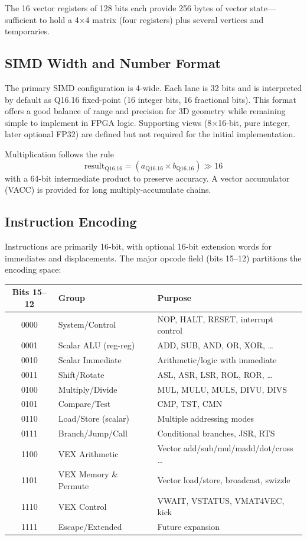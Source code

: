 \documentclass[11pt,a4paper]{article}
\begin{document}
The 16 vector registers of 128 bits each provide 256 bytes of vector state---sufficient to hold a 4$\times$4 matrix (four registers) plus several vertices and temporaries.

\subsection{SIMD Width and Number Format}

The primary SIMD configuration is 4-wide. Each lane is 32 bits and is interpreted by default as Q16.16 fixed-point (16 integer bits, 16 fractional bits). This format offers a good balance of range and precision for 3D geometry while remaining simple to implement in FPGA logic. Supporting views (8$\times$16-bit, pure integer, later optional FP32) are defined but not required for the initial implementation.

Multiplication follows the rule
\[
\text{result}_{\text{Q16.16}} = (a_{\text{Q16.16}} \times b_{\text{Q16.16}}) \gg 16
\]
with a 64-bit intermediate product to preserve accuracy. A vector accumulator (VACC) is provided for long multiply-accumulate chains.

\subsection{Instruction Encoding}

Instructions are primarily 16-bit, with optional 16-bit extension words for immediates and displacements. The major opcode field (bits 15--12) partitions the encoding space:

\begin{center}
\begin{tabular}{@{}clp{7cm}@{}}
\toprule
Bits 15--12 & Group & Purpose \\
\midrule
0000 & System/Control & NOP, HALT, RESET, interrupt control \\
0001 & Scalar ALU (reg-reg) & ADD, SUB, AND, OR, XOR, \ldots \\
0010 & Scalar Immediate & Arithmetic/logic with immediate \\
0011 & Shift/Rotate & ASL, ASR, LSR, ROL, ROR, \ldots \\
0100 & Multiply/Divide & MUL, MULU, MULS, DIVU, DIVS \\
0101 & Compare/Test & CMP, TST, CMN \\
0110 & Load/Store (scalar) & Multiple addressing modes \\
0111 & Branch/Jump/Call & Conditional branches, JSR, RTS \\
1100 & VEX Arithmetic & Vector add/sub/mul/madd/dot/cross \ldots \\
1101 & VEX Memory \& Permute & Vector load/store, broadcast, swizzle \\
1110 & VEX Control & VWAIT, VSTATUS, VMAT4VEC, kick \\
1111 & Escape/Extended & Future expansion \\
\bottomrule
\end{tabular}
\end{center}
\end{document}
